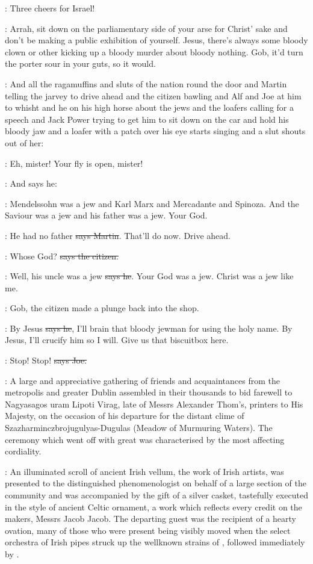 \citizen:
Three cheers for Israel!

\Nq:
Arrah, sit down on the parliamentary side of your arse for Christ'
sake and don't be making a public exhibition of yourself. Jesus, there's
always some bloody clown or other kicking up a bloody murder about
bloody nothing. Gob, it'd turn the porter sour in your guts, so it would.

\Nq:
And all the ragamuffins and sluts of the nation round the door and Martin
telling the jarvey to drive ahead and the citizen bawling and Alf and
Joe at him to whisht and he on his high horse about the jews and the
loafers calling for a speech and Jack Power trying to get him to sit down
on the car and hold his bloody jaw
and a loafer with a patch over his eye
starts singing  and a slut
shouts out of her:

\ragamuffin:
Eh, mister! Your fly is open, mister!

\Nq:
And says he:

\Bloom:
Mendelssohn was a jew and Karl Marx and Mercadante and Spinoza.
And the Saviour was a jew and his father was a jew. Your God.

\cunningham:
He had no father \sout{says Martin}.
That'll do now. Drive ahead.

\citizen:
Whose God? \sout{says the citizen.}

\Bloom:
Well, his uncle was a jew \sout{says he}.
Your God was a jew. Christ was a jew
like me.

\Nq:
Gob,
the citizen made a plunge back into the shop.

\citizen:
By Jesus \sout{says he},
I'll brain that bloody jewman for using the holy
name. By Jesus, I'll crucify him so I will.
Give us that biscuitbox here.

\joe:
Stop! Stop! \sout{says Joe.}

:
A large and appreciative gathering of friends and acquaintances from
the metropolis and greater Dublin assembled in their thousands to bid
farewell to Nagyasagos uram Lipoti Virag, late of Messrs Alexander
Thom's, printers to His Majesty, on the occasion of his departure for the
distant clime of Szazharminczbrojugulyas-Dugulas (Meadow of
Murmuring Waters). The ceremony which went off with great  was
characterised by the most affecting cordiality.%

:
An illuminated scroll of
ancient Irish vellum, the work of Irish artists, was presented to the
distinguished phenomenologist on behalf of a large section of the
community and was accompanied by the gift of a silver casket, tastefully
executed in the style of ancient Celtic ornament, a work which reflects
every credit on the makers, Messrs Jacob  Jacob. The departing guest
was the recipient of a hearty ovation, many of those who were present
being visibly moved when the select orchestra of Irish pipes struck up the
wellknown strains of ,
followed immediately by .

